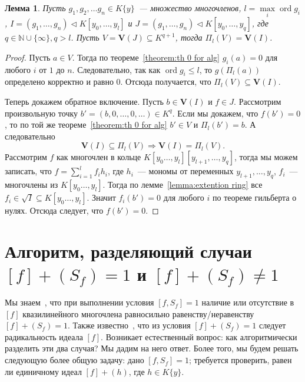 \documentclass[16pt]{article}
\DeclareMathOperator{\ord}{ord}
\renewcommand{\le}{\leqslant} %
\theoremstyle{plain1}
\newtheorem{lemma}[theorem1]{Лемма}
\theoremstyle{plain2}
\theoremstyle{plain}
\theoremstyle{plain3}
\theoremstyle{definition}
\theoremstyle{remark}
\begin{document}
\begin{lemma} \label{lemma:o proekcii}
Пусть $g_1,g_2,\ldots g_n\in K\{y\}$~--- множество многочленов,
$l=\max\limits_i\ord g_i$,
$I =(g_1,\ldots,g_n) \triangleleft K[y_0,\ldots,y_l]$ и $J =(g_1,\ldots,g_n) \triangleleft K[y_0,\ldots,y_q]$, где
$q\in \mathbb{N}\cup\{\infty\},q> l$. Пусть
$V=\mathbf{V}(J)\subseteq K^{q+1}$,
тогда $\Pi_l(V)=\mathbf{V}(I)$.
\end{lemma}

\begin{proof}

Пусть $a\in V$.
Тогда по теореме~\ref{theorem:th 0 for alg} $g_i(a)=0$ для любого $i$ от $1$ до $n$. Следовательно, так как $\ord g_i \le l$, то $g(\Pi_l(a))$ определено корректно и равно 0. Отсюда получается, что $\Pi_l(V)\subseteq\mathbf{V} (I)$.


Теперь  докажем обратное включение. Пусть $b\in \mathbf{V} (I)$  и $f\in J$. 
Рассмотрим произвольную точку $b'=(b,0,\ldots,0,\ldots)\in K^{q}$. Если мы докажем, что $f(b')=0$, то по той же теореме~\ref{theorem:th 0 for alg}  $b'\in V$ и $\Pi_l(b')=b$. А следовательно $$ \mathbf{V}(I)\subseteq\Pi_l(V)\Rightarrow \mathbf{V}(I)=\Pi_l(V).$$
Рассмотрим $f$  как многочлен в кольце $K[y_0\ldots,y_l][y_{l+1},\ldots,y_q]$, тогда мы можем записать, что $f=\sum\limits_{i=1}^lf_ih_i$, где $h_i$~--- мономы от переменных $y_{l+1},\ldots,y_q$, $f_i$~--- многочлены из $K[y_0\ldots,y_l]$. Тогда по лемме~\ref{lemma:extention ring} все $f_i\in \sqrt{I}\subseteq K[y_0\ldots,y_l]$. Значит $f_i(b')=0$ для любого $i$ по теореме гильберта о нулях. Отсюда следует, что $f(b')=0$.

\end{proof}


\section{Алгоритм, разделяющий случаи $[f]+(S_f)=1$ и $[f]+(S_f)\neq1$}

Мы знаем~\cite{Trushin}, что при выполнении условия $[f,S_f]=1$ наличие или отсутствие в $[f]$ квазилинейного многочлена равносильно равенству/неравенству $[f]+(S_f)=1$.
Также известно~\cite{E. R. Kolchin}, что из условия $[f]+(S_f)=1$ следует радикальность идеала $[f]$.
Возникает естественный вопрос: как алгоритмически разделить эти два случая?
Мы дадим на него ответ. Более того, мы будем решать следующую более общую задачу: дано $[f,S_f]=1$; требуется проверить, равен ли единичному идеал $[f]+(h)$, где $h\in K\{y\}$.
\end{document}
